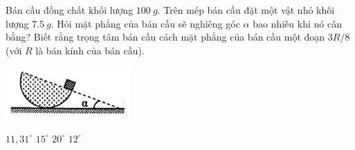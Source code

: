 \begin{ex}
	Bán cầu đồng chất khối lượng $\SI{100}{g}$. Trên mép bán cầu đặt một vật nhỏ khối lượng $\SI{7.5}{g}$. Hỏi mặt phẳng của bán cầu sẽ nghiêng góc $\alpha$ bao nhiêu khi nó cân bằng? Biết rằng trọng tâm bán cầu cách mặt phẳng của bán cầu một đoạn $3R/8$ (với $R$ là bán kính của bán cầu).
	\begin{center}
		\includegraphics[scale=1]{../figs/VN10-2021-PH-TP021-7.png}
	\end{center}
	\choice
	{\True $11,31^\circ$}
	{$15^\circ$}
	{$20^\circ$}
	{$12^\circ$}
\end{ex}
